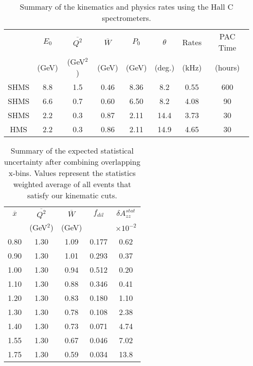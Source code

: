 
\begin{table}
\begin{center}
\begin{tabular}{c|c|c|c|c|c|c|c}
& $E_0$ & $\overline{Q^2}$    &  $\overline{W}$  	& $P_0$  &    $\theta$  &  Rates   & PAC Time   \\
& (GeV) & (GeV$^2$)  			& (GeV) 			& (GeV)  &     (deg.)   &   (kHz)  & (hours) \\
\hline\hline
SHMS & 8.8	&  1.5	&  0.46	&  8.36	&    8.2 	&    0.55	&   600 \\
SHMS & 6.6	&  0.7	&  0.60	&  6.50	&    8.2 	&    4.08	&   90 \\
SHMS & 2.2	&  0.3	&  0.87	&  2.11	&    14.4 	&    3.73	&   30 \\
HMS  & 2.2	&  0.3	&  0.86	&  2.11	&    14.9	&    4.65	&   30 \\  

\hline\hline
\end{tabular}
\caption{\label{RATES1}Summary of the kinematics and physics rates using the Hall C  spectrometers.}
\end{center}
\end{table}


\begin{table}
\begin{center}
\begin{tabular}{c|c|c|c|c}
 $\overline{x}$  & $\overline{Q^2}$  &  $\overline{W}$ & $f_{dil}$ & $\delta A_{zz}^{stat}$ \\
     & (GeV$^2$)  & (GeV) &  & $\times 10^{-2}$  \\
\hline\hline
    0.80		&  1.30	&  1.09 &  0.177	 & 0.62	\\
    0.90		&  1.30	&  1.01 &  0.293	 & 0.37	\\
    1.00		&  1.30	&  0.94 &  0.512	 & 0.20	\\
    1.10		&  1.30	&  0.88 &  0.346	 & 0.41	\\  
    1.20		&  1.30	&  0.83 &  0.180	 & 1.10	\\  
    1.30		&  1.30	&  0.78 &  0.108	 & 2.38	\\  
    1.40		&  1.30	&  0.73 &  0.071	 & 4.74	\\  
    1.55		&  1.30	&  0.67 &  0.046	 & 7.02	\\              
    1.75		&  1.30	&  0.59 &  0.034	 & 13.8	\\  
\hline\hline
\end{tabular}
\caption{\label{RATES2}Summary of the expected statistical uncertainty after combining overlapping x-bins.  Values represent the statistics weighted average of all events that satisfy our kinematic cuts. }
\end{center}
\end{table}




